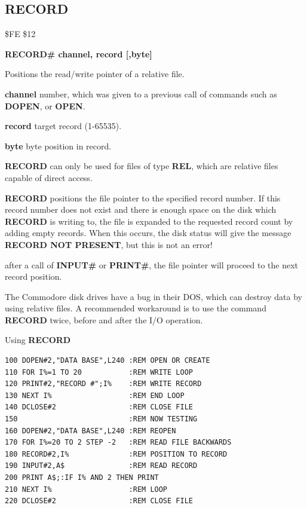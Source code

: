 
\newpage
\subsection{RECORD}
\begin{description}[leftmargin=2cm,style=nextline]
\item [Token:] \$FE \$12
\item [Format:] {\bf RECORD\# channel, record [,byte]}
\item [Usage:]  Positions the read/write pointer of a relative file.

                {\bf channel} number, which was given to a previous
                call of commands such as {\bf DOPEN}, or {\bf OPEN}.

                {\bf record} target record (1-65535).

                {\bf byte} byte position in record.

                {\bf RECORD} can only be used for files of
                type {\bf REL}, which are relative files capable
                of direct access.

               {\bf RECORD} positions the file pointer
               to the specified record number. If this record number
               does not exist and there is enough space on the disk
               which {\bf RECORD} is writing to,
               the file is expanded to the requested record count by adding
               empty records. When this occurs, the disk
               status will give the message {\bf RECORD NOT PRESENT}, but
               this is not an error!

               after a call of {\bf INPUT\#} or {\bf PRINT\#}, the file pointer will proceed
               to the next record position.

\item [Remarks:] The Commodore disk drives have a bug
               in their DOS, which can destroy data by using
               relative files. A recommended workaround is to
               use the command {\bf RECORD} twice, before
               and after the I/O operation.

\item [Example:] Using {\bf RECORD}
\begin{tcolorbox}[colback=black,coltext=white]
\verbatimfont{\codefont}
\begin{verbatim}
100 DOPEN#2,"DATA BASE",L240 :REM OPEN OR CREATE
110 FOR I%=1 TO 20           :REM WRITE LOOP
120 PRINT#2,"RECORD #";I%    :REM WRITE RECORD
130 NEXT I%                  :REM END LOOP
140 DCLOSE#2                 :REM CLOSE FILE
150                          :REM NOW TESTING
160 DOPEN#2,"DATA BASE",L240 :REM REOPEN
170 FOR I%=20 TO 2 STEP -2   :REM READ FILE BACKWARDS
180 RECORD#2,I%              :REM POSITION TO RECORD
190 INPUT#2,A$               :REM READ RECORD
200 PRINT A$;:IF I% AND 2 THEN PRINT
210 NEXT I%                  :REM LOOP
220 DCLOSE#2                 :REM CLOSE FILE


\end{verbatim}
\end{tcolorbox}
\end{description}
